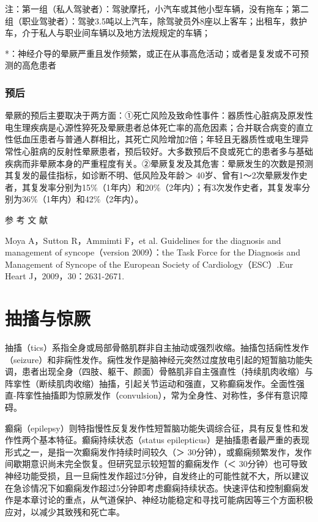 注：第一组（私人驾驶者）：驾驶摩托，小汽车或其他小型车辆，没有拖车；第二组（职业驾驶者）：驾驶3.5吨以上汽车，除驾驶员外8座以上客车；出租车，救护车，介于私人与职业间车辆以及地方法规规定的车辆；

*：神经介导的晕厥严重且发作频繁，或正在从事高危活动；或者是复发或不可预测的高危患者

\subsection{预后}

晕厥的预后主要取决于两方面：①死亡风险及致命性事件：器质性心脏病及原发性电生理疾病是心源性猝死及晕厥患者总体死亡率的高危因素；合并联合病变的直立性低血压患者与普通人群相比，其死亡风险增加2倍；年轻且无器质性或电生理异常性心脏病的反射性晕厥患者，预后较好。大多数预后不良或死亡的患者多与基础疾病而非晕厥本身的严重程度有关。②晕厥复发及其危害：晕厥发生的次数是预测其复发的最佳指标，如诊断不明、低风险及年龄＞
40岁、曾有1～2次晕厥发作史者，其复发率分别为15\%（1年内）和20\%（2年内）；有3次发作史者，其复发率分别为36\%（1年内）和42\%（2年内）。


\hypertarget{text00015.htmlux5cux23CHP1-4-6}{}
参 考 文 献

Moya A，Sutton R，Ammimti F，et al. Guidelines for the diagnosis and
management of syncope（version 2009）：the Task Force for the Diagnosis
and Management of Syncope of the European Society of
Cardiology（ESC）.Eur Heart J，2009，30：2631-2671.

\protect\hypertarget{text00016.html}{}{}

\chapter{抽搐与惊厥}

抽搐（tics）系指全身或局部骨骼肌群非自主抽动或强烈收缩。抽搐包括痫性发作（seizure）和非痫性发作。痫性发作是脑神经元突然过度放电引起的短暂脑功能失调，患者出现全身（四肢、躯干、颜面）骨骼肌非自主强直性（持续肌肉收缩）与阵挛性（断续肌肉收缩）抽搐，引起关节运动和强直，又称癫痫发作。全面性强直-阵挛性抽搐即为惊厥发作（convulsion），常为全身性、对称性，多伴有意识障碍。

癫痫（epilepsy）则特指慢性反复发作性短暂脑功能失调综合征，具有反复性和发作性两个基本特征。癫痫持续状态（status
epilepticus）是抽搐患者最严重的表现形式之一，是指一次癫痫发作持续时间较久（＞
30分钟），或癫痫频繁发作，发作间歇期意识尚未完全恢复。但研究显示较短暂的癫痫发作（＜
30分钟）也可导致神经功能受损，且一旦痫性发作超过5分钟，自发终止的可能性就不大，所以建议在急诊情况下如癫痫发作超过5分钟即考虑癫痫持续状态。快速评估和控制癫痫发作是本章讨论的重点，从气道保护、神经功能稳定和寻找可能病因等三个方面积极应对，以减少其致残和死亡率。


